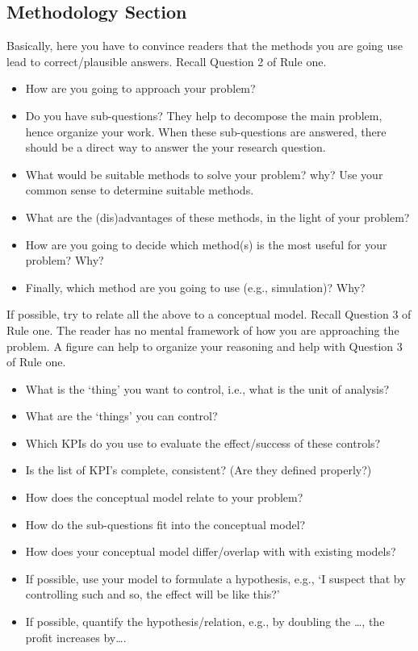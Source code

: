 \documentclass{article}
\begin{document}
\subsection{Methodology Section}
\label{sec:methods-section}

Basically, here you have to convince readers that the methods you are
going use lead to correct/plausible answers. Recall Question 2 of Rule one.

\begin{itemize}
\item How are you going to approach your problem?
\item Do you have sub-questions? They help to decompose the main
  problem, hence organize your work. When these sub-questions are
  answered, there should be a direct way to answer the your research
  question. 
\item What would be suitable methods to solve your problem? why? Use
  your common sense to determine suitable methods.
\item What are the (dis)advantages of these methods, in the light of
  your problem?
\item How are you going to decide which method(s) is the most useful for your problem? Why?
\item Finally, which method are you going to use (e.g., simulation)?
  Why?
\end{itemize}

If possible, try to relate all the above to a conceptual model. Recall
Question 3 of Rule one. The reader has no mental framework of how you
are approaching the problem. A figure can help to organize your
reasoning and help with Question 3 of Rule one.

\begin{itemize}
\item What is the `thing' you want to control, i.e., what is the unit of analysis?
\item What are the `things' you can control? 
\item Which KPIs do you use to  evaluate the effect/success of these controls?
\item Is the list of KPI's complete, consistent? (Are they defined properly?)
\item How does the conceptual model relate to your problem? 
\item How do the sub-questions fit into the conceptual model?
\item How does your conceptual model differ/overlap with with existing
  models?
\item If possible, use your model to formulate a hypothesis, e.g., `I
  suspect that by controlling such and so, the effect will be like
  this?'
\item If possible, quantify the hypothesis/relation, e.g., by
  doubling the \ldots, the profit increases by\ldots.
\end{itemize}
\end{document}
